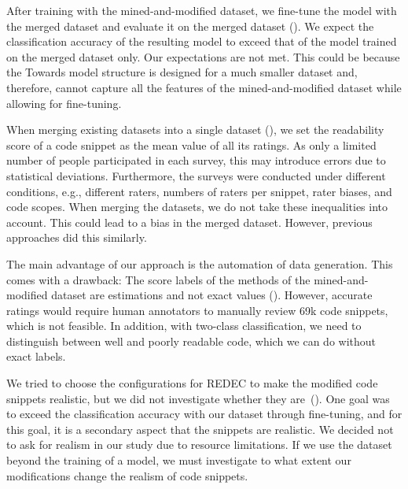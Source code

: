 \documentclass[%
class=scrreprt,
chapterprefix=false,%
open=right,%
twoside=true,%
paper=a4,%
logofile={Logo\_zentral\_farbig\_EN.png},%
thesistype=master,%
UKenglish,%
]{se2thesis}
\theoremstyle{definition}
\newcommand{\numSamples}{69k\xspace}
\begin{document}
	After training with the mined-and-modified dataset, we fine-tune the model with the merged dataset and evaluate it on the merged dataset (). We expect the classification accuracy of the resulting model to exceed that of the model trained on the merged dataset only.
	Our expectations are not met. This could be because the Towards model structure is designed for a much smaller dataset and, therefore, cannot capture all the features of the mined-and-modified dataset while allowing for fine-tuning.

	When merging existing datasets into a single dataset (), we set the readability score of a code snippet as the mean value of all its ratings. As only a limited number of people participated in each survey, this may introduce errors due to statistical deviations.
	Furthermore, the surveys were conducted under different conditions, e.g., different raters, numbers of raters per snippet, rater biases, and code scopes. When merging the datasets, we do not take these inequalities into account. This could lead to a bias in the merged dataset. However, previous approaches did this similarly.
	
	The main advantage of our approach is the automation of data generation.
	This comes with a drawback: The score labels of the methods of the mined-and-modified dataset are estimations and not exact values (). However, accurate ratings would require human annotators to manually review \numSamples code snippets, which is not feasible. In addition, with two-class classification, we need to distinguish between well and poorly readable code, which we can do without exact labels.
	
	We tried to choose the configurations for REDEC to make the modified code snippets realistic, but we did not investigate whether they are~(). One goal was to exceed the classification accuracy with our dataset through fine-tuning, and for this goal, it is a secondary aspect that the snippets are realistic. We decided not to ask for realism in our study due to resource limitations. 
	If we use the dataset beyond the training of a model, we must investigate to what extent our modifications change the realism of code snippets.
	
\end{document}
